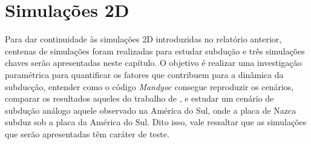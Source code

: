 \chapter{Simulações 2D}
\label{simulacoes}

Para dar continuidade às simulações 2D introduzidas no relatório anterior, centenas de simulações foram realizadas para estudar subdução e três simulações chaves serão apresentadas neste capítulo. O objetivo é realizar uma investigação paramétrica para quantificar os fatores que contribuem para a dinâmica da subducção, entender como o código \textit{Mandyoc} \citep{sacek2022mandyoc} consegue reproduzir os cenários, comparar os resultados aqueles do trabalho de \citet{strak2021thermo}, e estudar um cenário de subdução análogo aquele observado na América do Sul, onde a placa de Nazca subduz sob a placa da América do Sul. Dito isso, vale ressaltar que as simulações que serão apresentadas têm caráter de teste.





